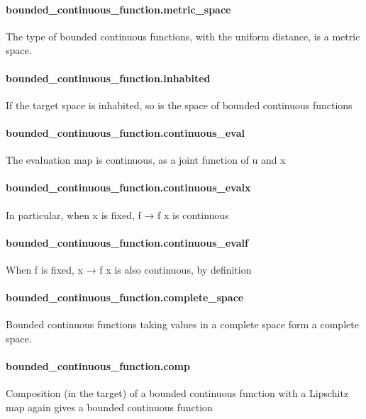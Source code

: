\documentclass{article}
\begin{document}
\paragraph{bounded\_continuous\_function.metric\_space}
\par
The type of bounded continuous functions, with the uniform distance, is a metric space.
\paragraph{bounded\_continuous\_function.inhabited}
\par
If the target space is inhabited, so is the space of bounded continuous functions
\paragraph{bounded\_continuous\_function.continuous\_eval}
\par
The evaluation map is continuous, as a joint function of 
\colorbox[RGB]{253,246,227}{{{{\color[RGB]{101, 123, 131} u }}}} and 
\colorbox[RGB]{253,246,227}{{{{\color[RGB]{101, 123, 131} x }}}}\paragraph{bounded\_continuous\_function.continuous\_evalx}
\par
In particular, when 
\colorbox[RGB]{253,246,227}{{{{\color[RGB]{101, 123, 131} x }}}} is fixed, 
\colorbox[RGB]{253,246,227}{{{{\color[RGB]{101, 123, 131} f  }}}{{{\color[RGB]{133, 153, 0} → }}}{{{\color[RGB]{101, 123, 131}  f x }}}} is continuous
\paragraph{bounded\_continuous\_function.continuous\_evalf}
\par
When 
\colorbox[RGB]{253,246,227}{{{{\color[RGB]{101, 123, 131} f }}}} is fixed, 
\colorbox[RGB]{253,246,227}{{{{\color[RGB]{101, 123, 131} x  }}}{{{\color[RGB]{133, 153, 0} → }}}{{{\color[RGB]{101, 123, 131}  f x }}}} is also continuous, by definition
\paragraph{bounded\_continuous\_function.complete\_space}
\par
Bounded continuous functions taking values in a complete space form a complete space.
\paragraph{bounded\_continuous\_function.comp}
\par
Composition (in the target) of a bounded continuous function with a Lipschitz map again
gives a bounded continuous function
\end{document}
